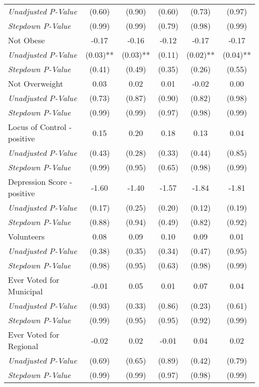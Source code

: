 \begin{tabular}{l c c c c c}
\quad \textit{Unadjusted P-Value} & (0.60) & (0.90) & (0.60) & (0.73) & (0.97) \\
\quad \textit{Stepdown P-Value} & (0.99) & (0.99) & (0.79) & (0.98) & (0.99) \\
Not Obese & -0.17 & -0.16 & -0.12 & -0.17 & -0.17 \\
\quad \textit{Unadjusted P-Value} & (0.03)** & (0.03)** & (0.11) & (0.02)** & (0.04)** \\
\quad \textit{Stepdown P-Value} & (0.41) & (0.49) & (0.35) & (0.26) & (0.55) \\
Not Overweight & 0.03 & 0.02 & 0.01 & -0.02 & 0.00 \\
\quad \textit{Unadjusted P-Value} & (0.73) & (0.87) & (0.90) & (0.82) & (0.98) \\
\quad \textit{Stepdown P-Value} & (0.99) & (0.99) & (0.97) & (0.98) & (0.99) \\
Locus of Control - positive & 0.15 & 0.20 & 0.18 & 0.13 & 0.04 \\
\quad \textit{Unadjusted P-Value} & (0.43) & (0.28) & (0.33) & (0.44) & (0.85) \\
\quad \textit{Stepdown P-Value} & (0.99) & (0.95) & (0.65) & (0.98) & (0.99) \\
Depression Score - positive & -1.60 & -1.40 & -1.57 & -1.84 & -1.81 \\
\quad \textit{Unadjusted P-Value} & (0.17) & (0.25) & (0.20) & (0.12) & (0.19) \\
\quad \textit{Stepdown P-Value} & (0.88) & (0.94) & (0.49) & (0.82) & (0.92) \\
Volunteers & 0.08 & 0.09 & 0.10 & 0.09 & 0.01 \\
\quad \textit{Unadjusted P-Value} & (0.38) & (0.35) & (0.34) & (0.47) & (0.95) \\
\quad \textit{Stepdown P-Value} & (0.98) & (0.95) & (0.63) & (0.98) & (0.99) \\
Ever Voted for Municipal & -0.01 & 0.05 & 0.01 & 0.07 & 0.04 \\
\quad \textit{Unadjusted P-Value} & (0.93) & (0.33) & (0.86) & (0.23) & (0.61) \\
\quad \textit{Stepdown P-Value} & (0.99) & (0.95) & (0.95) & (0.92) & (0.99) \\
Ever Voted for Regional & -0.02 & 0.02 & -0.01 & 0.04 & 0.02 \\
\quad \textit{Unadjusted P-Value} & (0.69) & (0.65) & (0.89) & (0.42) & (0.79) \\
\quad \textit{Stepdown P-Value} & (0.99) & (0.99) & (0.97) & (0.98) & (0.99) \\

\end{tabular}
